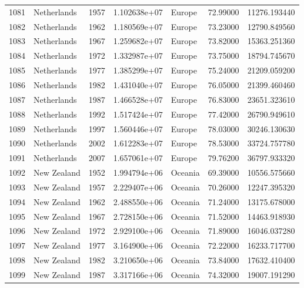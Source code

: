 \documentclass[
  letterpaper,
  DIV=11,
  numbers=noendperiod]{scrreprt}
\begin{document}
\begin{tabular}{llrrlrr}
1081 &               Netherlands &  1957 &  1.102638e+07 &    Europe &  72.99000 &   11276.193440 \\
1082 &               Netherlands &  1962 &  1.180569e+07 &    Europe &  73.23000 &   12790.849560 \\
1083 &               Netherlands &  1967 &  1.259682e+07 &    Europe &  73.82000 &   15363.251360 \\
1084 &               Netherlands &  1972 &  1.332987e+07 &    Europe &  73.75000 &   18794.745670 \\
1085 &               Netherlands &  1977 &  1.385299e+07 &    Europe &  75.24000 &   21209.059200 \\
1086 &               Netherlands &  1982 &  1.431040e+07 &    Europe &  76.05000 &   21399.460460 \\
1087 &               Netherlands &  1987 &  1.466528e+07 &    Europe &  76.83000 &   23651.323610 \\
1088 &               Netherlands &  1992 &  1.517424e+07 &    Europe &  77.42000 &   26790.949610 \\
1089 &               Netherlands &  1997 &  1.560446e+07 &    Europe &  78.03000 &   30246.130630 \\
1090 &               Netherlands &  2002 &  1.612283e+07 &    Europe &  78.53000 &   33724.757780 \\
1091 &               Netherlands &  2007 &  1.657061e+07 &    Europe &  79.76200 &   36797.933320 \\
1092 &               New Zealand &  1952 &  1.994794e+06 &   Oceania &  69.39000 &   10556.575660 \\
1093 &               New Zealand &  1957 &  2.229407e+06 &   Oceania &  70.26000 &   12247.395320 \\
1094 &               New Zealand &  1962 &  2.488550e+06 &   Oceania &  71.24000 &   13175.678000 \\
1095 &               New Zealand &  1967 &  2.728150e+06 &   Oceania &  71.52000 &   14463.918930 \\
1096 &               New Zealand &  1972 &  2.929100e+06 &   Oceania &  71.89000 &   16046.037280 \\
1097 &               New Zealand &  1977 &  3.164900e+06 &   Oceania &  72.22000 &   16233.717700 \\
1098 &               New Zealand &  1982 &  3.210650e+06 &   Oceania &  73.84000 &   17632.410400 \\
1099 &               New Zealand &  1987 &  3.317166e+06 &   Oceania &  74.32000 &   19007.191290 \\

\end{tabular}
\end{document}
